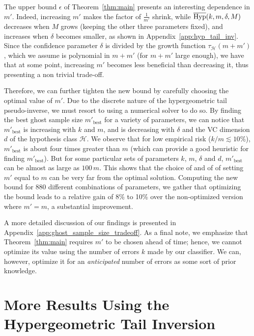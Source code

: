 \documentclass[twoside,11pt]{article}
\renewcommand{\H}{{\mathcal{H}}}
\newcommand{\HypInv}{\overline{\textnormal{Hyp}}}
\begin{document}
The upper bound $\epsilon$ of Theorem~\ref{thm:main} presents an interesting dependence in $m'$.
Indeed, increasing $m'$ makes the factor of $\frac{1}{m'}$ shrink, while $\HypInv(k,m,\delta,M)$ decreases when $M$ grows (keeping the other three parameters fixed), and increases when $\delta$ becomes smaller, as shown in Appendix~\ref{app:hyp_tail_inv}.
Since the confidence parameter $\delta$ is divided by the growth function $\tau_\H(m+m')$, which we assume is polynomial in $m+m'$ (for $m+m'$ large enough), we have that at some point, increasing $m'$ becomes less beneficial than decreasing it, thus presenting a non trivial trade-off.

Therefore, we can further tighten the new bound by carefully choosing the optimal value of $m'$.
Due to the discrete nature of the hypergeometric tail pseudo-inverse, we must resort to using a numerical solver to do so.
By finding the best ghost sample size $m'_\text{best}$ for a variety of parameters, we can notice that $m'_\text{best}$ is increasing with $k$ and $m$, and is decreasing with $\delta$ and the VC dimension $d$ of the hypothesis class $\H$.
We observe that for low empirical risk ($k/m \lesssim 10\%$), $m'_\text{best}$ is about four times greater than $m$ (which can provide a good heuristic for finding $m'_\text{best}$). But for some particular sets of parameters $k$, $m$, $\delta$ and $d$, $m'_\text{best}$ can be almost as large as $100\, m$.
This shows that the choice of \citeauthor{vapnik98} and of \citeauthor{as-93} of setting $m'$ equal to $m$ can be very far from the optimal solution.
Computing the new bound for 880 different combinations of parameters, we gather that optimizing the bound leads to a relative gain of 8\% to 10\% over the non-optimized version where $m'=m$, a substantial improvement. 

A more detailed discussion of our findings is presented in Appendix~\ref{app:ghost_sample_size_tradeoff}.
As a final note, we emphasize that Theorem~\ref{thm:main} requires $m'$ to be chosen ahead of time; hence, we cannot optimize its value using the number of errors $k$ made by our classifier.
We can, however, optimize it for an \emph{anticipated} number of errors as some sort of prior knowledge.




\section{More Results Using the Hypergeometric Tail Inversion}
\label{sec:other_results}
\end{document}
